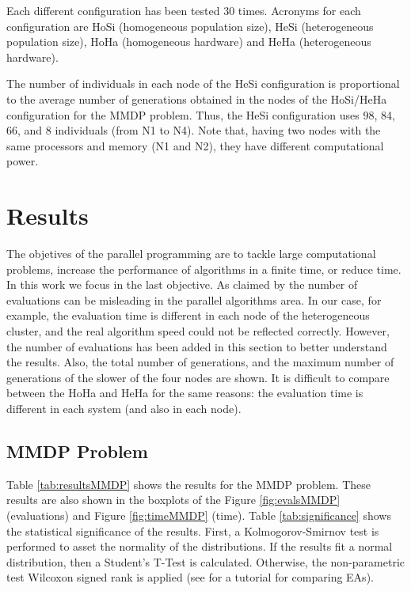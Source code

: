 Each different configuration has been tested 30 times. Acronyms for each configuration are HoSi (homogeneous population size), HeSi (heterogeneous population size), HoHa (homogeneous hardware) and HeHa (heterogeneous hardware). 

The number of individuals in each node of the HeSi configuration is proportional to the average number of generations obtained in the nodes of the HoSi/HeHa configuration for the MMDP problem. Thus, the HeSi configuration uses 98, 84, 66, and 8 individuals (from N1 to N4). Note that, having two nodes with the same processors and memory (N1 and N2), they have different computational power.

\section{Results}
\label{sec:results}

The objetives of the parallel programming are to tackle large computational problems, increase the performance of algorithms in a finite time, or reduce time. In this work we focus in the last objective.
As claimed by \cite{EVALUATIONPARALLEL} the number of evaluations can be misleading in the parallel algorithms area. In our case, for example, the evaluation time is different in each node of the heterogeneous cluster, and the real algorithm speed could not be reflected correctly. However, the number of evaluations has been added in this section to better understand the results. Also, the total number of generations, and the maximum number of generations of the slower of the four nodes are shown. It is difficult to compare between the HoHa and HeHa for the same reasons: the evaluation time is different in each system (and also in each node).

\subsection{MMDP Problem}

Table \ref{tab:resultsMMDP} shows the results for the MMDP problem. These results are also shown in the boxplots of the Figure \ref{fig:evalsMMDP} (evaluations) and Figure \ref{fig:timeMMDP} (time). Table \ref{tab:significance} shows the statistical significance of the results. First, a Kolmogorov-Smirnov test is performed to asset the normality of the distributions. If the results fit a normal distribution, then a Student's T-Test is calculated. Otherwise, the non-parametric test Wilcoxon signed rank is applied (see \cite{TUTORIAL} for a tutorial for comparing EAs).

